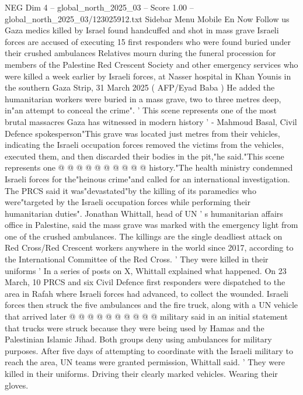 \begin{textsample}{NEG Dim 4 – global\_north\_2025\_03 – Score 1.00 – global\_north\_2025\_03/123025912.txt}  \label{ex:f4_neg_393}
Sidebar Menu Mobile En Now Follow us Gaza medics killed by Israel found handcuffed and shot in mass grave Israeli forces are accused of executing 15 first responders who were found buried under their crushed ambulances Relatives mourn during the funeral procession for members of the Palestine Red Crescent Society and other emergency services who were killed a week earlier by Israeli forces, at Nasser hospital in Khan Younis in the southern Gaza Strip, 31 March 2025 ( AFP/Eyad Baba ) He added the humanitarian workers were buried in a mass grave, two to three metres deep, in"an attempt to conceal the crime". ' This scene represents one of the most brutal massacres Gaza has witnessed in modern history ' - Mahmoud Basal, Civil Defence spokesperson"This grave was located just metres from their vehicles, indicating the Israeli occupation forces removed the victims from the vehicles, executed them, and then discarded their bodies in the pit,"he said."This scene represents one @ @ @ @ @ @ @ @ @ @ history."The health ministry condemned Israeli forces for the"heinous crime"and called for an international investigation.
The PRCS said it was"devastated"by the killing of its paramedics who were"targeted by the Israeli occupation forces while performing their humanitarian duties".
Jonathan Whittall, head of UN ' s humanitarian affairs office in Palestine, said the mass grave was marked with the emergency light from one of the crushed ambulances.
The killings are the single deadliest attack on Red Cross/Red Crescent workers anywhere in the world since 2017, according to the International Committee of the Red Cross. ' They were killed in their uniforms ' In a series of posts on X, Whittall explained what happened.
On 23 March, 10 PRCS and six Civil Defence first responders were dispatched to the area in Rafah where Israeli forces had advanced, to collect the wounded.
Israeli forces then struck the five ambulances and the fire truck, along with a UN vehicle that arrived later @ @ @ @ @ @ @ @ @ @ military said in an initial statement that trucks were struck because they were being used by Hamas and the Palestinian Islamic Jihad.
Both groups deny using ambulances for military purposes.
After five days of attempting to coordinate with the Israeli military to reach the area, UN teams were granted permission, Whittall said. ' They were killed in their uniforms.
Driving their clearly marked vehicles.
Wearing their gloves.

\end{textsample}
